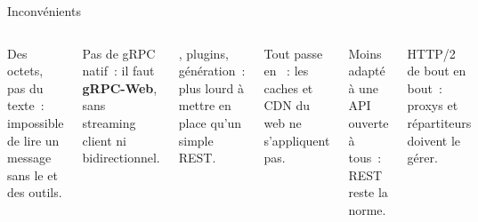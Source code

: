 \documentclass[aspectratio=169,11pt]{beamer}
\begin{document}
\begin{frame}{Inconvénients}
  \vspace{0.1cm}
  \begin{columns}[T,onlytextwidth]
    \begin{carte}[gred,height=2.55cm]\footnotesize Des octets, pas du texte~: impossible de lire un message sans le  et des outils.\end{carte}
    \begin{carte}[gred,height=2.55cm]\footnotesize Pas de gRPC natif~: il faut \textbf{gRPC-Web}, sans streaming client ni bidirectionnel.\end{carte}
    \begin{carte}[gred,height=2.55cm]\footnotesize {}, plugins, génération~: plus lourd à mettre en place qu'un simple REST.\end{carte}
    \begin{carte}[gred,height=2.55cm]\footnotesize Tout passe en ~: les caches et CDN du web ne s'appliquent pas.\end{carte}
    \begin{carte}[gred,height=2.55cm]\footnotesize Moins adapté à une API ouverte à tous~: REST reste la norme.\end{carte}
    \begin{carte}[gred,height=2.55cm]\footnotesize HTTP/2 de bout en bout~: proxys et répartiteurs doivent le gérer.\end{carte}
  \end{columns}
\end{frame}
\end{document}
